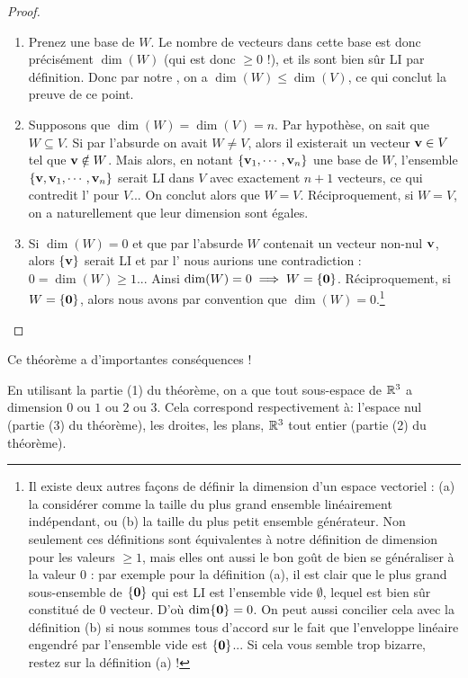 \begin{proof}
\begin{enumerate}
\item Prenez une base de $W$. Le nombre de vecteurs dans cette base est donc précisément $\dim(W)$ (qui est donc $\geq 0$ !), et ils sont bien sûr LI par définition. Donc par notre , on a $\dim(W) \leq \dim(V)$, ce qui conclut la preuve de ce point.

\item Supposons que $\dim(W) = \dim(V)=n$.  Par hypothèse, on sait que $W\subseteq V$. Si par l'absurde on avait $W\neq V$,
alors il existerait un vecteur $\mathbf{v} \in V$ tel que $\mathbf{v} \notin W$.
Mais alors, en notant $\{\mathbf{v}_1,\cdots,\mathbf{v}_n\}$ une base de $W$, 
l'ensemble $\{\mathbf{v}, \mathbf{v}_1,\cdots,\mathbf{v}_n\}$ serait LI dans $V$
avec exactement $n+1$ vecteurs, ce qui contredit l' pour $V$...
On conclut alors que $W=V$. Réciproquement, si $W=V$, on a naturellement que leur dimension sont égales.

\item Si $\dim (W)=0$ et que par l'absurde $W$ contenait un vecteur non-nul $\mathbf{v}$, alors $\{\mathbf{v}\}$ serait LI et par l' nous aurions une contradiction : $0 = \dim (W) \ge 1$... Ainsi $\dim (W)=0 \implies W=\{\mathbf{0}\}$. Réciproquement, si $W=\{\mathbf{0}\}$, alors nous avons par convention que $\dim(W)=0$.\footnote{Il existe deux autres façons de définir la dimension d'un espace vectoriel : (a) la considérer comme la taille du plus grand ensemble linéairement indépendant, ou (b) la taille du plus petit ensemble gén\'erateur. Non seulement ces définitions sont équivalentes à notre définition de dimension pour les valeurs $\geq1$, mais elles ont aussi le bon goût de bien se généraliser à la valeur $0$ : par exemple pour la définition (a), il est clair que le plus grand sous-ensemble de $\{\mathbf{0}\}$ qui est LI est l'ensemble vide $\emptyset$, lequel est bien sûr constitué de $0$ vecteur. D'où $\dim\{\mathbf{0}\}=0$. On peut aussi concilier cela avec la définition (b) si nous sommes tous d'accord sur le fait que l'enveloppe lin\'eaire engendr\'e par l'ensemble vide est $\{\mathbf{0}\}$... Si cela vous semble trop bizarre, restez sur la définition (a) !}
\end{enumerate}
\end{proof}

Ce théorème a d'importantes conséquences !

\begin{myexample} En utilisant la partie (1) du théorème, on a que tout sous-espace de $\mathbb{R}^3$ a dimension $0$ ou $1$ ou $2$ ou $3$.  
Cela correspond respectivement \`a: l'espace nul (partie (3) du théorème),
les droites, les plans, $\mathbb{R}^3$ tout entier (partie (2) du théorème). \end{myexample}

